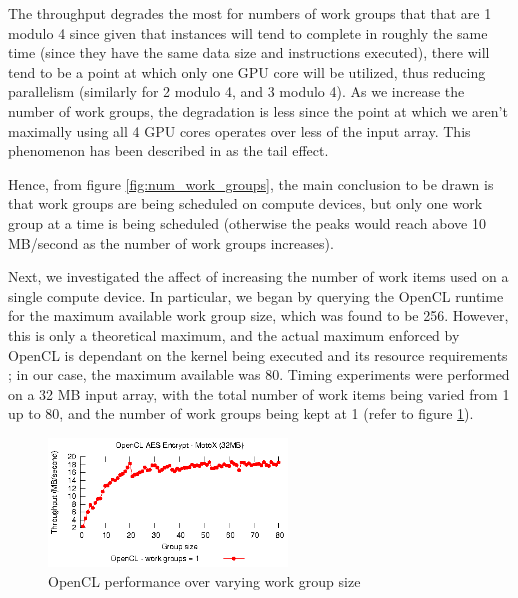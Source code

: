 \documentclass[conference,10pt]{IEEEtran}
\begin{document}
The throughput degrades the most for numbers of work groups that that are 1 modulo 4 since given 
that instances will tend to complete in roughly the same time (since they have the same data size 
and instructions executed), there will tend to be a point at which only one GPU core will be 
utilized, thus reducing parallelism (similarly for 2 modulo 4, and 3 modulo 4). As we increase the 
number of work groups, the degradation is less since the point at which we aren't maximally using 
all 4 GPU cores operates over less of the input array.  This phenomenon has been described in 
\cite{gpu_opt} as the tail effect.

Hence, from figure \ref{fig:num_work_groups}, the main conclusion to be drawn is that work groups 
are being scheduled on compute devices, but only one work group at a time is being scheduled 
(otherwise the peaks would reach above 10 MB/second as the number of work groups increases).

Next, we investigated the affect of increasing the number of work items used on a single compute 
device.  In particular, we began by querying the OpenCL runtime for the maximum available work group 
size, which was found to be 256.  However, this is only a theoretical maximum, and the actual 
maximum enforced by OpenCL is dependant on the kernel being executed and its resource requirements 
\cite{opencl_guide}; in our case, the maximum available was 80.  Timing experiments were performed 
on a 32 MB input array, with the total number of work items being varied from 1 up to 80, and the 
number of work groups being kept at 1 (refer to figure \ref{fig:work_group_size}).

\begin{figure}[!t]
\centering
\includegraphics[width=2.5in]{../final/motox/4.2/sample_opencl_aes_work_group_size.32MB.1_work_groups.again.report.eps}
\caption{OpenCL performance over varying work group size}
\label{fig:work_group_size}
\end{figure}
\end{document}
